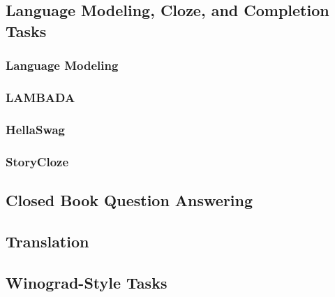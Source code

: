 \documentclass{article}
\begin{document}
    \subsection{Language Modeling, Cloze, and Completion Tasks}
    \label{section:Language Modeling, Cloze, and Completion Tasks}
    

        \subsubsection{Language Modeling}
        \label{section:Language Modeling}
        
        
        \subsubsection{LAMBADA}
        \label{section:LAMBADA}
        
        
        \subsubsection{HellaSwag}
        \label{section:HellaSwag}
        
        
        \subsubsection{StoryCloze}
        \label{section:StoryCloze}
        
        
        
    \subsection{Closed Book Question Answering}
    \label{section:Closed Book Question Answering / Knowledge Base Tasks}
    
    
    \subsection{Translation}
    \label{section:Translation}
    
    
    \subsection{Winograd-Style Tasks}
    \label{section:Winograd-Style_Tasks}
    
    
\end{document}
